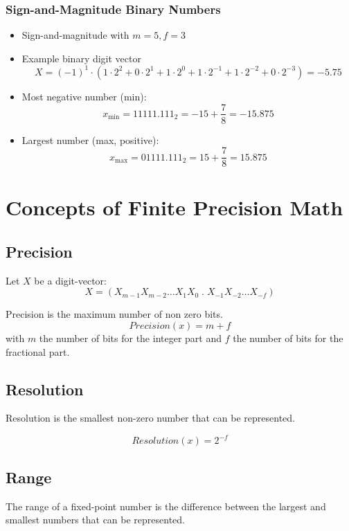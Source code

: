 \documentclass[12pt,openany]{book}
\begin{document}
			      	\subsubsection{Sign-and-Magnitude Binary Numbers}
			      	\begin{itemize}
			      		\item[] Sign-and-magnitude with \( m = 5, f = 3 \)
			      		\item[] Example binary digit vector
			      		      \[
			      		      	X = (-1)^{1} \cdot (1 \cdot 2^2 + 0 \cdot 2^1 + 1 \cdot 2^0 + 1 \cdot 2^{-1} + 1 \cdot 2^{-2} + 0 \cdot 2^{-3}) = -5.75
			      		      \]
			      		\item[] Most negative number (min):
			      		      \[
			      		      	x_{\text{min}} = 1 1111.111_2 = -15 + \frac{7}{8} = -15.875
			      		      \]
			      		\item[] Largest number (max, positive):
			      		      \[
			      		      	x_{\text{max}} = 0 1111.111_2 = 15 + \frac{7}{8} = 15.875
			      		      \]
			      	\end{itemize}
			      	      
			      	\section{Concepts of
			      	Finite Precision Math}
			      	\subsection{Precision}
			      	Let \( X \) be a digit-vector:
			      	\[ X = (X_{m-1} X_{m-2} \dots X_1 X_0 \; . \;  X_{-1} X_{-2} \dots X_{-f}) \]
			      	
			      	Precision is the maximum number of non zero bits.
			      	$$Precision(x) = m + f$$ with \(m\) the number of bits for the integer part and \(f\) the number of bits for the fractional part.
			      	
			      	\subsection{Resolution}
			      	Resolution is the smallest non-zero number that can be represented.
			      	
			      	$$Resolution(x) = 2^{-f}$$
			      	
			      	
			      	\subsection{Range}
			      	The range of a fixed-point number is the difference between the largest and smallest numbers that can be represented.
			      	
\end{document}
